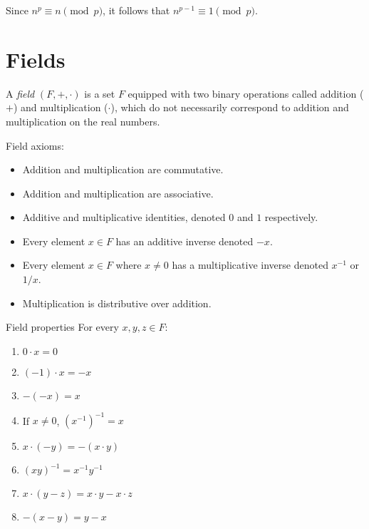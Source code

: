 \begin{cor}\label{fermat-little-corallary}
    Since $n^p \equiv n \pmod p$, it follows that $n^{p-1} \equiv 1 \pmod p$.
\end{cor}

\section{Fields}

\begin{defn}
    A \emph{field} $(F, +, \cdot)$ is a set $F$ equipped with two binary operations called addition ($+$) and multiplication ($\cdot$), which do not necessarily correspond to addition and multiplication on the real numbers.

    Field axioms:
    \begin{itemize}
        \item Addition and multiplication are commutative.
        \item Addition and multiplication are associative.
        \item Additive and multiplicative identities, denoted $0$ and $1$ respectively.
        \item Every element $x \in F$ has an additive inverse denoted $-x$.
        \item Every element $x \in F$ where $x \neq 0$ has a multiplicative inverse denoted $x^{-1}$ or $1/x$.
        \item Multiplication is distributive over addition.
    \end{itemize}
\end{defn}

\begin{thm}{Field properties}\label{field-properties}\proofbreak
    For every $x, y, z \in F$:
    \begin{enumerate}
        \item $0 \cdot x = 0$
        \item $(-1) \cdot x = -x$
        \item $-(-x) = x$
        \item If $x \neq 0$, $\left(x^{-1}\right)^{-1} = x$
        \item $x \cdot (-y) = -(x\cdot y)$
        \item $(xy)^{-1} = x^{-1}y^{-1}$
        \item $x\cdot(y-z) = x\cdot y - x \cdot z$
        \item $-(x - y) = y - x$
    \end{enumerate}
\end{thm}

